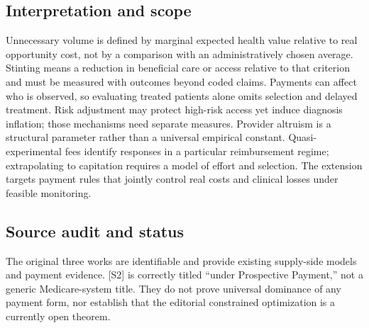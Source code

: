 \documentclass[11pt,a4paper]{article}
\begin{document}
\subsection*{Interpretation and scope}
Unnecessary volume is defined by marginal expected health value relative to real opportunity cost, not by a comparison with an administratively chosen average. Stinting means a reduction in beneficial care or access relative to that criterion and must be measured with outcomes beyond coded claims. Payments can affect who is observed, so evaluating treated patients alone omits selection and delayed treatment. Risk adjustment may protect high-risk access yet induce diagnosis inflation; those mechanisms need separate measures. Provider altruism is a structural parameter rather than a universal empirical constant. Quasi-experimental fees identify responses in a particular reimbursement regime; extrapolating to capitation requires a model of effort and selection. The extension targets payment rules that jointly control real costs and clinical losses under feasible monitoring.

\subsection*{Source audit and status}
The original three works are identifiable and provide existing supply-side models and payment evidence. [S2] is correctly titled “under Prospective Payment,” not a generic Medicare-system title. They do not prove universal dominance of any payment form, nor establish that the editorial constrained optimization is a currently open theorem.
\end{document}
